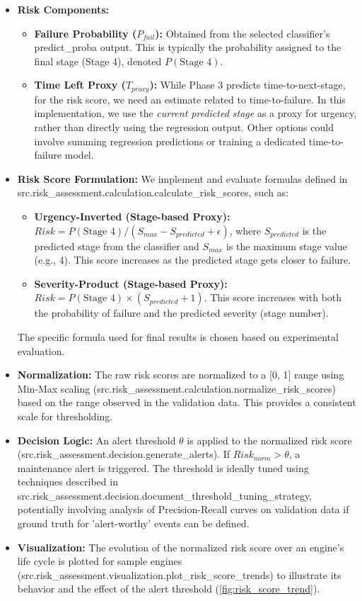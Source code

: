 \begin{itemize}
	\item \textbf{Risk Components:}
	      \begin{itemize}
		      \item \textbf{Failure Probability ($P_{fail}$):} Obtained from the selected classifier's predict\_proba output. This is typically the probability assigned to the final stage (Stage 4), denoted $P(\text{Stage 4})$.
		      \item \textbf{Time Left Proxy ($T_{proxy}$):} While Phase 3 predicts time-to-next-stage, for the risk score, we need an estimate related to time-to-failure. In this implementation, we use the \textit{current predicted stage} as a proxy for urgency, rather than directly using the regression output. Other options could involve summing regression predictions or training a dedicated time-to-failure model.
	      \end{itemize}
	\item \textbf{Risk Score Formulation:} We implement and evaluate formulas defined in src.risk\_assessment.calculation.calculate\_risk\_scores, such as:
	      \begin{itemize}
		      \item \textbf{Urgency-Inverted (Stage-based Proxy):} $Risk = P(\text{Stage 4}) / (S_{max} - S_{predicted} + \epsilon)$, where $S_{predicted}$ is the predicted stage from the classifier and $S_{max}$ is the maximum stage value (e.g., 4). This score increases as the predicted stage gets closer to failure.
		      \item \textbf{Severity-Product (Stage-based Proxy):} $Risk = P(\text{Stage 4}) \times (S_{predicted} + 1)$. This score increases with both the probability of failure and the predicted severity (stage number).
	      \end{itemize}
	      The specific formula used for final results is chosen based on experimental evaluation.
	\item \textbf{Normalization:} The raw risk scores are normalized to a [0, 1] range using Min-Max scaling (src.risk\_assessment.calculation.normalize\_risk\_scores) based on the range observed in the validation data. This provides a consistent scale for thresholding.
	\item \textbf{Decision Logic:} An alert threshold $\theta$ is applied to the normalized risk score (src.risk\_assessment.decision.generate\_alerts). If $Risk_{norm} > \theta$, a maintenance alert is triggered. The threshold is ideally tuned using techniques described in src.risk\_assessment.decision.document\_threshold\_tuning\_strategy, potentially involving analysis of Precision-Recall curves on validation data if ground truth for 'alert-worthy' events can be defined.
	\item \textbf{Visualization:} The evolution of the normalized risk score over an engine's life cycle is plotted for sample engines (src.risk\_assessment.visualization.plot\_risk\_score\_trends) to illustrate its behavior and the effect of the alert threshold (\cref{fig:risk_score_trend}).
\end{itemize}

